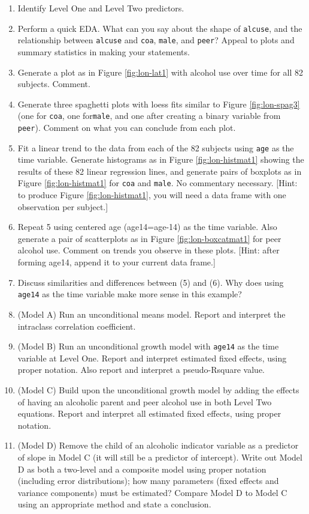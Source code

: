 \documentclass[
]{krantz}
\providecommand{\tightlist}{%
  \setlength{\itemsep}{0pt}\setlength{\parskip}{0pt}}
\begin{document}
\begin{enumerate}
  \begin{enumerate}
  \def\labelenumii{\arabic{enumii}.}
  \tightlist
  \item
    Identify Level One and Level Two predictors.
  \item
    Perform a quick EDA. What can you say about the shape of \texttt{alcuse}, and the relationship between \texttt{alcuse} and \texttt{coa}, \texttt{male}, and \texttt{peer}? Appeal to plots and summary statistics in making your statements.
  \item
    Generate a plot as in Figure \ref{fig:lon-lat1} with alcohol use over time for all 82 subjects. Comment.
  \item
    Generate three spaghetti plots with loess fits similar to Figure \ref{fig:lon-spag3} (one for \texttt{coa}, one for\texttt{male}, and one after creating a binary variable from \texttt{peer}). Comment on what you can conclude from each plot.
  \item
    Fit a linear trend to the data from each of the 82 subjects using \texttt{age} as the time variable. Generate histograms as in Figure \ref{fig:lon-histmat1} showing the results of these 82 linear regression lines, and generate pairs of boxplots as in Figure \ref{fig:lon-histmat1} for \texttt{coa} and \texttt{male}. No commentary necessary. {[}Hint: to produce Figure \ref{fig:lon-histmat1}, you will need a data frame with one observation per subject.{]}
  \item
    Repeat 5 using centered age (age14=age-14) as the time variable. Also generate a pair of scatterplots as in Figure \ref{fig:lon-boxcatmat1} for peer alcohol use. Comment on trends you observe in these plots. {[}Hint: after forming age14, append it to your current data frame.{]}
  \item
    Discuss similarities and differences between (5) and (6). Why does using \texttt{age14} as the time variable make more sense in this example?
  \item
    (Model A) Run an unconditional means model. Report and interpret the intraclass correlation coefficient.
  \item
    (Model B) Run an unconditional growth model with \texttt{age14} as the time variable at Level One. Report and interpret estimated fixed effects, using proper notation. Also report and interpret a pseudo-Rsquare value.
  \item
    (Model C) Build upon the unconditional growth model by adding the effects of having an alcoholic parent and peer alcohol use in both Level Two equations. Report and interpret all estimated fixed effects, using proper notation.
  \item
    (Model D) Remove the child of an alcoholic indicator variable as a predictor of slope in Model C (it will still be a predictor of intercept). Write out Model D as both a two-level and a composite model using proper notation (including error distributions); how many parameters (fixed effects and variance components) must be estimated? Compare Model D to Model C using an appropriate method and state a conclusion.
  \end{enumerate}
\end{enumerate}
\end{document}
